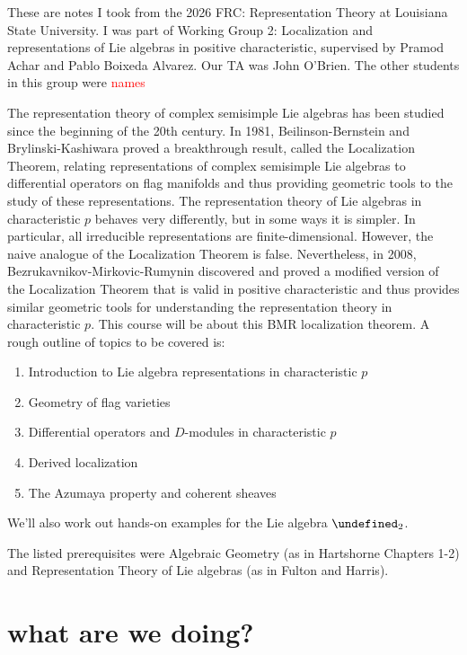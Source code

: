 \documentclass[11pt,leqno]{article}
\newcommand{\sai}[1]{\textcolor{red}{#1}}
\theoremstyle{plain}
\theoremstyle{definition}
\numberwithin{equation}{section}
\numberwithin{lem}{section}
\let\sl\undefined
\DeclareMathOperator{\sl}{\mathfrak{sl}}
\begin{document}
These are notes I took from the 2026 FRC: Representation Theory at Louisiana State University. I was part of Working Group 2: Localization and representations of Lie algebras in positive characteristic, supervised by Pramod Achar and Pablo Boixeda Alvarez. Our TA was John O'Brien. The other students in this group were \sai{names}

The representation theory of complex semisimple Lie algebras has been studied since the beginning of the 20th century. In 1981, Beilinson-Bernstein and Brylinski-Kashiwara proved a breakthrough result, called the Localization Theorem, relating representations of complex semisimple Lie algebras to differential operators on flag manifolds and thus providing geometric tools to the study of these representations. The representation theory of Lie algebras in characteristic $p$ behaves very differently, but in some ways it is simpler. In particular, all irreducible representations are finite-dimensional. However, the naive analogue of the Localization Theorem is false. Nevertheless, in 2008, Bezrukavnikov-Mirkovic-Rumynin discovered and proved a modified version of the Localization Theorem that is valid in positive characteristic and thus provides similar geometric tools for understanding the representation theory in characteristic $p$. This course will be about this BMR localization theorem. A rough outline of topics to be covered is:
\begin{enumerate}[label = \roman*.]
  \item Introduction to Lie algebra representations in characteristic $p$
  \item Geometry of flag varieties
  \item Differential operators and $D$-modules in characteristic $p$
  \item Derived localization
  \item The Azumaya property and coherent sheaves
\end{enumerate}
We'll also work out hands-on examples for the Lie algebra $\sl_2$.

The listed prerequisites were Algebraic Geometry (as in Hartshorne Chapters 1-2) and Representation Theory of Lie algebras (as in Fulton and Harris).

\section{what are we doing?}
\end{document}
